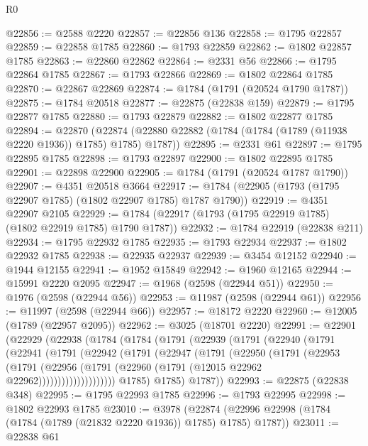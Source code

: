 \begin{lexlean}{R0}
\begin{coremodule}
@22856 := @2588 @2220
@22857 := @22856 @136
@22858 := @1795 @22857
@22859 := @22858 @1785
@22860 := @1793 @22859
@22862 := @1802 @22857 @1785
@22863 := @22860 @22862
@22864 := @2331 @56
@22866 := @1795 @22864 @1785
@22867 := @1793 @22866
@22869 := @1802 @22864 @1785
@22870 := @22867 @22869
@22874 := @1784 (@1791 (@20524 @1790 @1787))
@22875 := @1784 @20518
@22877 := @22875 (@22838 @159)
@22879 := @1795 @22877 @1785
@22880 := @1793 @22879
@22882 := @1802 @22877 @1785
@22894 := @22870
    (@22874 (@22880 @22882 (@1784 (@1784 (@1789 (@11938 @2220 @1936)) @1785) @1785) @1787))
@22895 := @2331 @61
@22897 := @1795 @22895 @1785
@22898 := @1793 @22897
@22900 := @1802 @22895 @1785
@22901 := @22898 @22900
@22905 := @1784 (@1791 (@20524 @1787 @1790))
@22907 := @4351 @20518 @3664
@22917 := @1784 (@22905 (@1793 (@1795 @22907 @1785) (@1802 @22907 @1785) @1787 @1790))
@22919 := @4351 @22907 @2105
@22929 := @1784 (@22917 (@1793 (@1795 @22919 @1785) (@1802 @22919 @1785) @1790 @1787))
@22932 := @1784 @22919 (@22838 @211)
@22934 := @1795 @22932 @1785
@22935 := @1793 @22934
@22937 := @1802 @22932 @1785
@22938 := @22935 @22937
@22939 := @3454 @12152
@22940 := @1944 @12155
@22941 := @1952 @15849
@22942 := @1960 @12165
@22944 := @15991 @2220 @2095
@22947 := @1968 (@2598 (@22944 @51))
@22950 := @1976 (@2598 (@22944 @56))
@22953 := @11987 (@2598 (@22944 @61))
@22956 := @11997 (@2598 (@22944 @66))
@22957 := @18172 @2220
@22960 := @12005 (@1789 (@22957 @2095))
@22962 := @3025 (@18701 @2220)
@22991 := @22901
    (@22929
      (@22938
        (@1784
          (@1784
            (@1791
              (@22939
                (@1791
                  (@22940
                    (@1791
                      (@22941
                        (@1791
                          (@22942
                            (@1791
                              (@22947
                                (@1791
                                  (@22950
                                    (@1791
                                      (@22953
                                        (@1791
                                          (@22956
                                            (@1791
                                              (@22960
                                                (@1791 (@12015 @22962 @22962))))))))))))))))))))
            @1785)
          @1785)
        @1787))
@22993 := @22875 (@22838 @348)
@22995 := @1795 @22993 @1785
@22996 := @1793 @22995
@22998 := @1802 @22993 @1785
@23010 := @3978
    (@22874 (@22996 @22998 (@1784 (@1784 (@1789 (@21832 @2220 @1936)) @1785) @1785) @1787))
@23011 := @22838 @61

\end{coremodule}
\end{lexlean}
